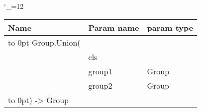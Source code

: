 \begingroup \catcode`\_=12 \tt
\begin{tabular}{lll}
\toprule
\textrm{Name}&\textrm{Param name}&\textrm{param type}\\
\midrule
\hbox to 0pt {Group.Union(\hss}\\
& cls\\
& group1 & Group\\
& group2 & Group\\
\hbox to 0pt{) -> Group\hss}\\
\bottomrule
\end{tabular}
\endgroup
